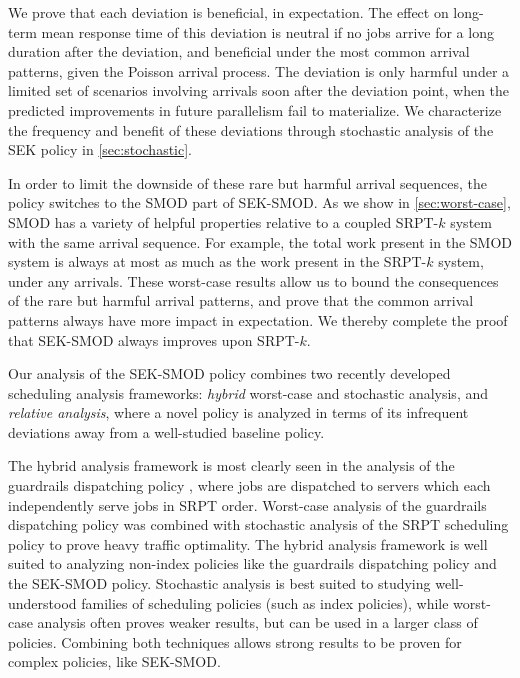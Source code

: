\documentclass[acmsmall]{acmart}
\begin{document}
We prove that each deviation is beneficial, in expectation.
The effect on long-term mean response time of this deviation is neutral if no jobs arrive for a long duration after the deviation, and beneficial under the most common arrival patterns, given the Poisson arrival process.
The deviation is only harmful under a limited set of scenarios involving arrivals soon after the deviation point, when the predicted improvements in future parallelism fail to materialize.
We characterize the frequency and benefit of these deviations
through stochastic analysis of the SEK policy in \cref{sec:stochastic}.

In order to limit the downside of these rare but harmful arrival sequences, the policy switches to the SMOD part of SEK-SMOD.
As we show in \cref{sec:worst-case},
SMOD has a variety of helpful properties relative to a coupled SRPT-$k$ system with the same arrival sequence.
For example, the total work present in the SMOD system is always at most as much as the work present in the SRPT-$k$ system,
under any arrivals.
These worst-case results allow us to bound the consequences of the rare but harmful arrival patterns, and prove that the common arrival patterns always have more impact in expectation.
We thereby complete the proof that SEK-SMOD always improves upon SRPT-$k$.

Our analysis of the SEK-SMOD policy combines two recently developed scheduling analysis frameworks: \emph{hybrid} worst-case and stochastic analysis, and \emph{relative analysis}, where a novel policy is analyzed in terms of its infrequent deviations away from a well-studied baseline policy.


The hybrid analysis framework is most clearly seen in the analysis of the guardrails dispatching policy \cite{grosof-etal-2019guardrails},
where jobs are dispatched to servers which each independently serve jobs in SRPT order.
Worst-case analysis of the guardrails dispatching policy was combined with stochastic analysis of the SRPT scheduling policy to prove heavy traffic optimality.
The hybrid analysis framework is well suited to analyzing non-index policies like the guardrails dispatching policy and the SEK-SMOD policy.
Stochastic analysis is best suited to studying well-understood families of scheduling policies (such as index policies),
while worst-case analysis often proves weaker results, but can be used in a larger class of policies. %
Combining both techniques allows strong results to be proven for complex policies, like SEK-SMOD.
\end{document}
